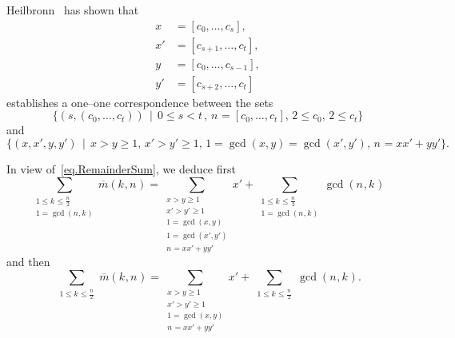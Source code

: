 \documentclass[12pt,a4paper]{article}
\newcommand{\Size}[1][]{n_{#1}}
\newcommand{\Shift}[1][]{k_{#1}}
\newcommand{\RemainderSumOf}[2]{\overline{m}(#1,#2)}
\newcommand{\gcdOf}[1]{\gcd(#1)}
\newcommand{\ExpansionOf}[1]{[#1]}
\newcommand{\LastIndex}{t}
\newcommand{\MidIndex}{s}
\newcommand{\Entry}[1][]{c_{#1}}
\newcommand{\LeftA}{x}
\newcommand{\LeftB}{x'}
\newcommand{\RightA}{y}
\newcommand{\RightB}{y'}
\newcommand{\SetOf}[2][]{\{#2\,\mid\,#1\}}
\newcommand{\Sum}[2][]{\sum_{#1}#2}
\begin{document}
  Heilbronn~\cite[page~93]{Heilbronn69} has shown that
  \begin{align*}
    \LeftA &= \ExpansionOf{\Entry[0],\ldots,\Entry[\MidIndex]},\\
    \LeftB &= \ExpansionOf{\Entry[\MidIndex+1],\ldots,\Entry[\LastIndex]},\\
    \RightA &= \ExpansionOf{\Entry[0],\ldots,\Entry[\MidIndex-1]},\\
    \RightB &= \ExpansionOf{\Entry[\MidIndex+2],\ldots,\Entry[\LastIndex]}
  \end{align*}
  establishes a one--one correspondence between the sets
  \[
    \SetOf[{
      0\leq\MidIndex<\LastIndex\,,\,
      \Size=\ExpansionOf{\Entry[0],\ldots,\Entry[\LastIndex]},\,
      2 \leq \Entry[0],\,
      2\leq \Entry[\LastIndex]
    }]{
      (\MidIndex,(\Entry[0],\ldots,\Entry[\LastIndex]))
    }
  \]
  and
  \[
    \SetOf[
    \LeftA > \RightA \geq 1,\,
    \LeftB > \RightB \geq 1,\,
    1 = \gcdOf{\LeftA,\RightA} = \gcdOf{\LeftB,\RightB},\,
    \Size = \LeftA\LeftB+\RightA\RightB
    ]{(\LeftA,\LeftB,\RightA,\RightB)}
    .
  \]

  In view of~\eqref{eq.RemainderSum}, we deduce first
  \[
    \Sum[{
      \substack{
        1\leq\Shift\leq\frac{\Size}{2}\\
        1=\gcdOf{\Size,\Shift}
      }
    }]{
      \RemainderSumOf{\Shift}{\Size}
    }
    =
    \Sum[{
      \substack{
        \LeftA > \RightA \geq 1 \\
        \LeftB > \RightB \geq 1 \\
        1 = \gcdOf{\LeftA,\RightA} \\
        1 = \gcdOf{\LeftB,\RightB} \\
        \Size = \LeftA\LeftB+\RightA\RightB
      }
    }]
    \LeftB
    +
    \Sum[{
      \substack{
        1\leq\Shift\leq\frac{\Size}{2}\\
        1=\gcdOf{\Size,\Shift}
      }
    }]{
      \gcdOf{\Size,\Shift}
    }
  \]
  and then
  \begin{equation}\label{eq.heilbron}
    \Sum[{
      \substack{
        1\leq\Shift\leq\frac{\Size}{2}\\
      }
    }]{
      \RemainderSumOf{\Shift}{\Size}
    }
    =
    \Sum[{
      \substack{
        \LeftA > \RightA \geq 1 \\
        \LeftB > \RightB \geq 1 \\
        1 = \gcdOf{\LeftA,\RightA} \\
        \Size = \LeftA\LeftB+\RightA\RightB
      }
    }]
    \LeftB
    +
    \Sum[{
      \substack{
        1\leq\Shift\leq\frac{\Size}{2}\\
      }
    }]{
      \gcdOf{\Size,\Shift}
    }
    .
  \end{equation}
\end{document}

